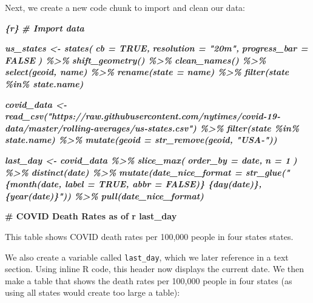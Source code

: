 \documentclass[
]{book}
\newenvironment{Shaded}{\begin{snugshade}}{\end{snugshade}}
\newcommand{\FunctionTok}[1]{\textcolor[rgb]{0.13,0.29,0.53}{\textbf{#1}}}
\newcommand{\InformationTok}[1]{\textcolor[rgb]{0.56,0.35,0.01}{\textbf{\textit{#1}}}}
\newcommand{\NormalTok}[1]{#1}
\begin{document}
Next, we create a new code chunk to import and clean our data:

\begin{Shaded}
\begin{Highlighting}[]
\InformationTok{\textasciigrave{}\textasciigrave{}\textasciigrave{}\{r\}}
\InformationTok{\# Import data}

\InformationTok{us\_states \textless{}{-} states(}
\InformationTok{  cb = TRUE,}
\InformationTok{  resolution = "20m",}
\InformationTok{  progress\_bar = FALSE}
\InformationTok{) \%\textgreater{}\%}
\InformationTok{  shift\_geometry() \%\textgreater{}\%}
\InformationTok{  clean\_names() \%\textgreater{}\%}
\InformationTok{  select(geoid, name) \%\textgreater{}\%}
\InformationTok{  rename(state = name) \%\textgreater{}\%}
\InformationTok{  filter(state \%in\% state.name)}

\InformationTok{covid\_data \textless{}{-} read\_csv("https://raw.githubusercontent.com/nytimes/covid{-}19{-}data/master/rolling{-}averages/us{-}states.csv") \%\textgreater{}\%}
\InformationTok{  filter(state \%in\% state.name) \%\textgreater{}\%}
\InformationTok{  mutate(geoid = str\_remove(geoid, "USA{-}"))}

\InformationTok{last\_day \textless{}{-} covid\_data \%\textgreater{}\%}
\InformationTok{  slice\_max(}
\InformationTok{    order\_by = date,}
\InformationTok{    n = 1}
\InformationTok{  ) \%\textgreater{}\%}
\InformationTok{  distinct(date) \%\textgreater{}\%}
\InformationTok{  mutate(date\_nice\_format = str\_glue("\{month(date, label = TRUE, abbr = FALSE)\} \{day(date)\}, \{year(date)\}")) \%\textgreater{}\%}
\InformationTok{  pull(date\_nice\_format)}
\InformationTok{\textasciigrave{}\textasciigrave{}\textasciigrave{}}

\FunctionTok{\# COVID Death Rates as of \textasciigrave{}r last\_day\textasciigrave{}}

\NormalTok{This table shows COVID death rates per 100,000 people in four states states.}
\end{Highlighting}
\end{Shaded}

We also create a variable called \texttt{last\_day}, which we later reference in a text section. Using inline R code, this header now displays the current date. We then make a table that shows the death rates per 100,000 people in four states (as using all states would create too large a table):
\end{document}
